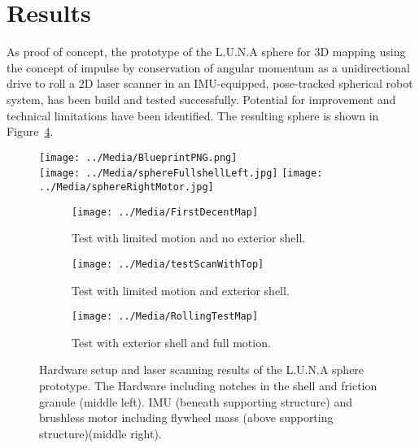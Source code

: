 \section{Results}
\label{sec:Results}

As proof of concept, the prototype of the L.U.N.A sphere for 3D mapping using the concept of impulse by conservation of angular momentum as a unidirectional drive to roll a 2D laser scanner in an IMU-equipped, pose-tracked spherical robot system, has been build and tested successfully. Potential for improvement and technical limitations have been identified.
The resulting sphere is shown in Figure~\ref{sec:TechnicalApproach:fig:setup}.
\begin{figure}
\centering                                                                                                                                                                                                        
\texttt{[image: ../Media/BlueprintPNG.png]}                                                                                                                                                      \\
\vspace{0.5cm}
\texttt{[image: ../Media/sphereFullshellLeft.jpg]}
\texttt{[image: ../Media/sphereRightMotor.jpg]}   
\\\vspace{0.5cm}
\begin{subfigure}[b]{0.32\textwidth}
	\centering
	\texttt{[image: ../Media/FirstDecentMap]}
	\caption{Test with limited motion and no exterior shell.}
	\label{sec:experimentalResults:3DLaserScanning:fig:firstpointcloud}
\end{subfigure}
\begin{subfigure}[b]{0.32\textwidth}
	\centering
	\texttt{[image: ../Media/testScanWithTop]}
	\caption{Test with limited motion and exterior shell.}
	\label{sec:experimentalResults:3DLaserScanning:fig:secondpointcloud}
\end{subfigure}
\begin{subfigure}[b]{0.32\textwidth}
	\centering
	\texttt{[image: ../Media/RollingTestMap]}
	\caption{Test with exterior shell and full motion.}
	\label{sec:experimentalResults:3DLaserScanning:fig:thirdpointcloud}
\end{subfigure}
\caption{Hardware setup and laser scanning results of the L.U.N.A sphere prototype. The Hardware including notches in the shell and friction granule (middle left). IMU (beneath supporting structure) and brushless motor including flywheel mass (above supporting structure)(middle right).}
\label{sec:TechnicalApproach:fig:setup}

\end{figure}
